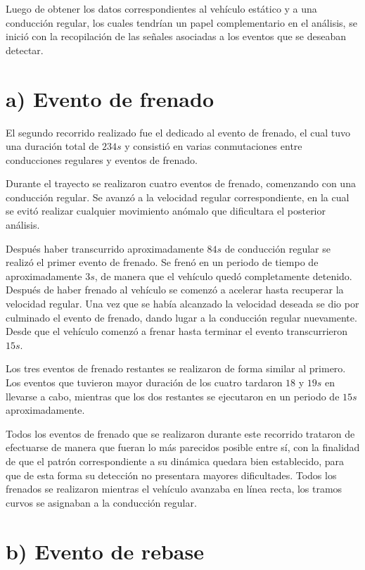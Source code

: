 Luego de obtener los datos correspondientes al vehículo estático y a una conducción regular, los cuales tendrían un papel complementario en el análisis, se inició con la recopilación de las señales asociadas a los eventos que se deseaban detectar.

\section{a) Evento de frenado}

El segundo recorrido realizado fue el dedicado al evento de frenado, el cual tuvo una duración total de $234s$ y consistió en varias conmutaciones entre conducciones regulares y eventos de frenado. 

Durante el trayecto se realizaron cuatro eventos de frenado, comenzando con una conducción regular. 
Se avanzó a la velocidad regular correspondiente, en la cual se evitó realizar cualquier movimiento anómalo que dificultara el posterior análisis.

Después haber transcurrido aproximadamente $84s$ de conducción regular se realizó el primer evento de frenado. 
Se frenó en un periodo de tiempo de aproximadamente $3s$, de manera que el vehículo quedó completamente detenido. 
Después de haber frenado al vehículo se comenzó a acelerar hasta recuperar la velocidad regular. 
Una vez que se había alcanzado la velocidad deseada se dio por culminado el evento de frenado, dando lugar a la conducción regular nuevamente. 
Desde que el vehículo comenzó a frenar hasta terminar el evento transcurrieron $15s$.

Los tres eventos de frenado restantes se realizaron de forma similar al primero. 
Los eventos que tuvieron mayor duración de los cuatro tardaron $18$ y $19s$ en llevarse a cabo, mientras que los dos restantes se ejecutaron en un periodo de $15s$ aproximadamente.

Todos los eventos de frenado que se realizaron durante este recorrido trataron de efectuarse de manera que fueran lo más parecidos posible entre sí, con la finalidad de que el patrón correspondiente a su dinámica quedara bien establecido, para que de esta forma su detección no presentara mayores dificultades. 
Todos los frenados se realizaron mientras el vehículo avanzaba en línea recta, los tramos curvos se asignaban a la conducción regular.

\section{b) Evento de rebase}

